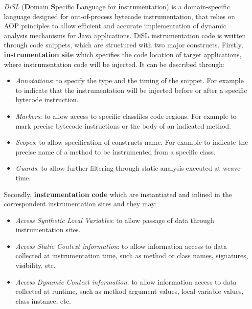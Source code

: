 \documentclass[]{usiinfthesis}
\begin{document}
\textit{DiSL} (\textbf{D}omain \textbf{S}pecific \textbf{L}anguage for \textbf{i}nstrumentation) is a domain-specific language designed for out-of-process bytecode instrumentation, that relies on AOP principles to allow efficient and accurate implementation of dynamic analysis mechanisms for Java applications. DiSL instrumentation code is written through code snippets, which are structured with two major constructs. Firstly, \textbf{instrumentation site} which specifies the code location of target applications, where instrumentation code will be injected. It can be described through:
\begin{itemize}
    \item \textit{Annotations}: to specify the type and the timing of the snippet. For example to indicate that the instrumentation will be injected before or after a specific bytecode instruction.
    \item \textit{Markers}: to allow access to specific classfiles code regions. For example to mark precise bytecode instructions or the body of an indicated method.
    \item \textit{Scopes}: to allow specification of constructs name. For example to indicate the precise name of a method to be instrumented from a specific class. 
    \item \textit{Guards}: to allow further filtering through static analysis executed at weave-time.
\end{itemize}
Secondly, \textbf{instrumentation code} which are instantiated and inlined in the correspondent instrumentation sites and they may:
\begin{itemize}
    \item \textit{Access Synthetic Local Variables}: to allow passage of data through instrumentation sites.
    \item \textit{Access Static Context information}: to allow information access to data collected at instrumentation time, such as method or class names, signatures, visibility, etc.
    \item \textit{Access Dynamic Context information}: to allow information access to data collected at runtime, such as method argument values, local variable values, class instance, etc.
\end{itemize}
\end{document}

